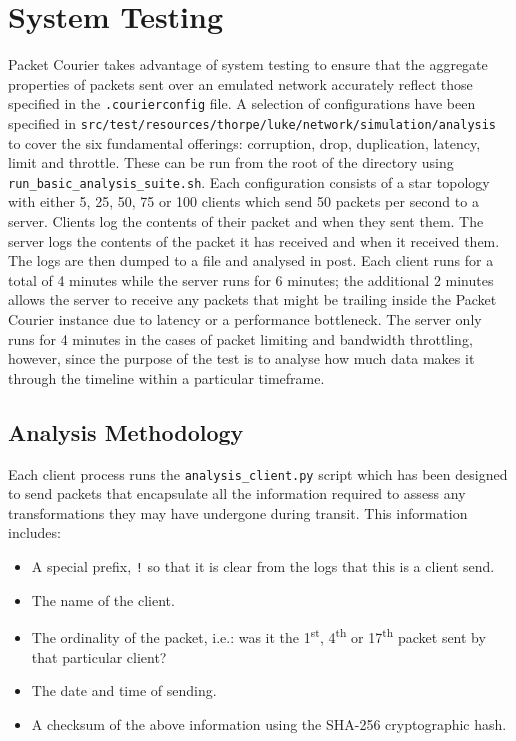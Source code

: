\section{System Testing}\label{section:system_testing}

Packet Courier takes advantage of system testing to ensure that the aggregate properties of packets sent over an
emulated network accurately reflect those specified in the \texttt{.courierconfig} file. A selection of
configurations have been specified in \texttt{src/test/resources/thorpe/luke/network/simulation/analysis} to cover
the six fundamental offerings: corruption, drop, duplication, latency, limit and throttle. These can be run from the
root of the directory using \texttt{run\_basic\_analysis\_suite.sh}. Each configuration consists of a star topology
with either 5, 25, 50, 75 or 100 clients which send 50 packets per second to a server. Clients log the contents of
their packet and when they sent them. The server logs the contents of the packet it has received and when it received
them. The logs are then dumped to a file and analysed in post. Each client runs for a total of 4 minutes while the
server runs for 6 minutes; the additional 2 minutes allows the server to receive any packets that might be trailing
inside the Packet Courier instance due to latency or a performance bottleneck. The server only runs for 4 minutes in
the cases of packet limiting and bandwidth throttling, however, since the purpose of the test is to analyse how much
data makes it through the timeline within a particular timeframe.

\subsection{Analysis Methodology}\label{subsection:analysis_methodology}

Each client process runs the \texttt{analysis\_client.py} script which has been designed to send packets that
encapsulate all the information required to assess any transformations they may have undergone during transit. This
information includes:
\begin{itemize}
    \item A special prefix, \texttt{!} so that it is clear from the logs that this is a client send.
    \item The name of the client.
    \item The ordinality of the packet, i.e.: was it the 1\textsuperscript{st}, 4\textsuperscript{th} or
    17\textsuperscript{th} packet sent by that particular client?
    \item The date and time of sending.
    \item A checksum of the above information using the SHA-256 cryptographic hash\cite{sha256_hash,
        python_sha256_hash}.
\end{itemize}

